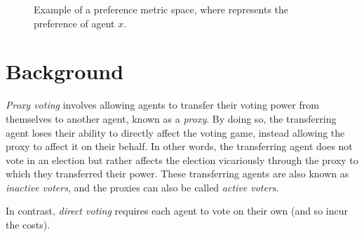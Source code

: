 \begin{figure}[htbp]
    \centering

    \caption{Example of a preference metric space, where  represents the
    preference of agent $x$.}
    \label{fig:system-metric-space}
\end{figure}






\section{Background}\label{sec:background}
\textit{Proxy voting} involves allowing agents to transfer their voting power
from themselves to another agent, known as a \textit{proxy}\cite[para.~1.4]
{Cohensius2017}.
By doing so, the transferring agent loses their ability to directly affect the
voting game, instead allowing the proxy to affect it on their behalf.
In other words, the transferring agent does not vote in an election but rather
affects the election vicariously through the proxy to which they transferred
their power.
These transferring agents are also known as \textit{inactive voters}, and the
proxies can also be called \textit{active voters}.

In contrast, \textit{direct voting} requires each agent to vote on their own
(and so incur the costs).

